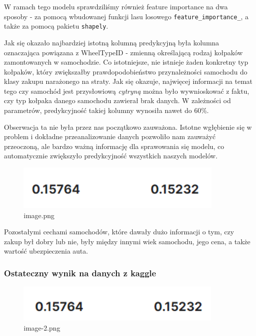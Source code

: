 \documentclass[11pt]{article}
\begin{document}
W ramach tego modelu sprawdziliśmy również feature importance na dwa
sposoby - za pomocą wbudowanej funkcji lasu losowego
\texttt{feature\_importance\_}, a także za pomocą pakietu
\texttt{shapely}.

Jak się okazało najbardziej istotną kolumną predykcyjną była kolumna
oznaczająca powiązana z WheelTypeID - zmienną określającą rodzaj
kołpaków zamontowanych w samochodzie. Co istotniejsze, nie istnieje
żaden konkretny typ kołpaków, który zwiększałby prawdopodobieństwo
przynależności samochodu do klasy zakupu narażonego na straty. Jak się
okazuje, najwięcej informacji na temat tego czy samochód jest
przysłowiową \emph{cytryną} można było wywnioskować z faktu, czy typ
kołpaka danego samochodu zawierał brak danych. W zależności od
parametrów, predykcyjność takiej kolumny wynosiła nawet do 60\%.

Obserwacja ta nie była przez nas początkowo zauważona. Istotne
wgłębienie się w problem i dokładne przeanalizowanie danych pozwoliło
nam zauważyć przeoczoną, ale bardzo ważną informację dla sprawowania się
modelu, co automatycznie zwiększyło predykcyjność wszystkich naszych
modelów.

\begin{figure}
\centering
\includegraphics{raport_files/image.png}
\caption{image.png}
\end{figure}

Pozostałymi cechami samochodów, które dawały dużo informacji o tym, czy
zakup był dobry lub nie, były między innymi wiek samochodu, jego cena, a
także wartość ubezpieczenia auta.

\hypertarget{ostateczny-wynik-na-danych-z-kaggle}{%
\subsubsection{Ostateczny wynik na danych z
kaggle}\label{ostateczny-wynik-na-danych-z-kaggle}}

\begin{figure}
\centering
\includegraphics{raport_files/image-2.png}
\caption{image-2.png}
\end{figure}
\end{document}
